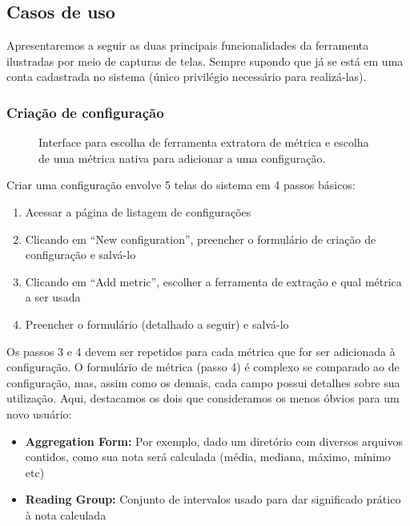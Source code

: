 \documentclass[12pt]{article}
\begin{document}
  \subsection{Casos de uso}
  Apresentaremos a seguir as duas principais funcionalidades da ferramenta ilustradas por meio de capturas de telas. Sempre supondo que já se está em uma conta cadastrada no sistema (único privilégio necessário para realizá-las).

    \subsubsection{Criação de configuração}
    \begin{figure}[h!]
      \centering
      \caption{Interface para escolha de ferramenta extratora de métrica e escolha de uma métrica nativa para adicionar a uma configuração.}
      \label{fig:choose-metric}
    \end{figure}

    Criar uma configuração envolve 5 telas do sistema em 4 passos básicos:
    \begin{enumerate}
      \item Acessar a página de listagem de configurações
      \item Clicando em ``New configuration'', preencher o formulário de criação de configuração e salvá-lo
      \item Clicando em ``Add metric'', escolher a ferramenta de extração e qual métrica a ser usada
      \item Preencher o formulário (detalhado a seguir) e salvá-lo
    \end{enumerate}

    Os passos 3 e 4 devem ser repetidos para cada métrica que for ser adicionada à configuração. O formulário de métrica (passo 4) é complexo se comparado ao de configuração, mas, assim como os demais, cada campo possui detalhes sobre sua utilização. Aqui, destacamos os dois que consideramos os menos óbvios para um novo usuário:
    \begin{itemize}
      \item \textbf{Aggregation Form:} Por exemplo, dado um diretório com diversos arquivos contidos, como sua nota será calculada (média, mediana, máximo, mínimo etc)
      \item \textbf{Reading Group:} Conjunto de intervalos usado para dar significado prático à nota calculada
    \end{itemize}
\end{document}
